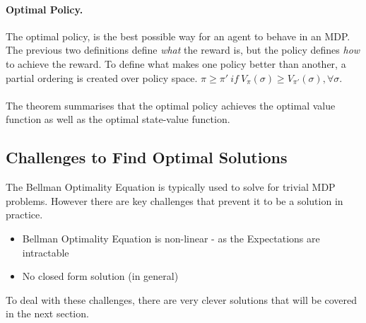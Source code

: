 \documentclass[ %
                    author={Ashwinder Khurana},
                supervisor={Prof Dave Cliff},
                    degree={MEng},
                     title={The Deeply Reinforced Trader},
                  subtitle={},
                      type={enterprise},
                      year={2020} ]{dissertation}
\begin{document}
{\paragraph{Optimal Policy.} The optimal policy, is the best possible way for an agent to behave in an MDP. The previous two definitions define \textit{what} the reward is, but the policy defines \textit{how} to achieve the reward. To define what makes one policy better than another, a partial ordering is created over policy space. $\pi \geq \pi'  \: if \: V_\pi(\sigma) \geq V_{\pi'}(\sigma), \forall \sigma$. 
\\
\\
\noindent 
The theorem \cite{MDP-theorem} summarises that the optimal policy achieves the optimal value function as well as the optimal state-value function. 

\subsection{Challenges to Find Optimal Solutions}
The Bellman Optimality Equation is typically used to solve for trivial MDP problems. However there are key challenges that prevent it to be a solution in practice. 

\begin{itemize}
\item Bellman Optimality Equation is non-linear - as the Expectations are intractable 
\item No closed form solution (in general)
\end{itemize}

\noindent
To deal with these challenges, there are very clever solutions that will be covered in the next section.

}
\end{document}
